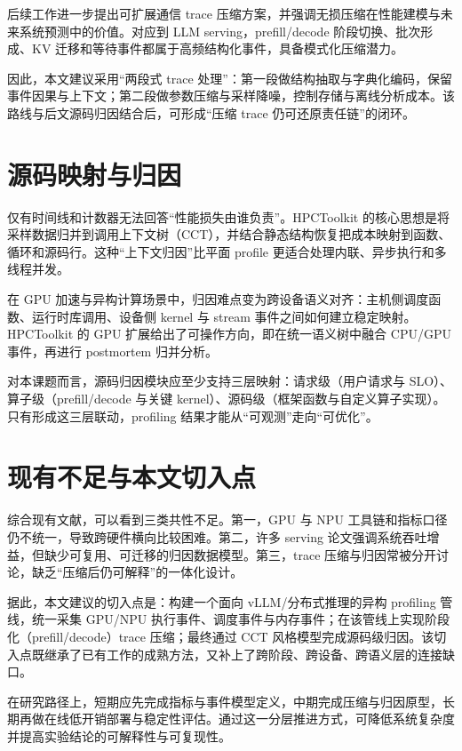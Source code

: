 \documentclass[supercite]{Experimental_Report}
\begin{document}
后续工作进一步提出可扩展通信 trace 压缩方案，并强调无损压缩在性能建模与未来系统预测中的价值\cite{krishnamoorthy2010scalabletrace}。对应到 LLM serving，prefill/decode 阶段切换、批次形成、KV 迁移和等待事件都属于高频结构化事件，具备模式化压缩潜力。

因此，本文建议采用“两段式 trace 处理”：第一段做结构抽取与字典化编码，保留事件因果与上下文；第二段做参数压缩与采样降噪，控制存储与离线分析成本。该路线与后文源码归因结合后，可形成“压缩 trace 仍可还原责任链”的闭环。

\section{源码映射与归因}

仅有时间线和计数器无法回答“性能损失由谁负责”。HPCToolkit 的核心思想是将采样数据归并到调用上下文树（CCT），并结合静态结构恢复把成本映射到函数、循环和源码行\cite{adhianto2010hpctoolkit}。这种“上下文归因”比平面 profile 更适合处理内联、异步执行和多线程并发。

在 GPU 加速与异构计算场景中，归因难点变为跨设备语义对齐：主机侧调度函数、运行时库调用、设备侧 kernel 与 stream 事件之间如何建立稳定映射。HPCToolkit 的 GPU 扩展给出了可操作方向，即在统一语义树中融合 CPU/GPU 事件，再进行 postmortem 归并分析\cite{zhou2021hpctoolkitgpu,adhianto2024refininghpctoolkit}。

对本课题而言，源码归因模块应至少支持三层映射：请求级（用户请求与 SLO）、算子级（prefill/decode 与关键 kernel）、源码级（框架函数与自定义算子实现）。只有形成这三层联动，profiling 结果才能从“可观测”走向“可优化”。

\section{现有不足与本文切入点}

综合现有文献，可以看到三类共性不足。第一，GPU 与 NPU 工具链和指标口径仍不统一，导致跨硬件横向比较困难。第二，许多 serving 论文强调系统吞吐增益，但缺少可复用、可迁移的归因数据模型。第三，trace 压缩与归因常被分开讨论，缺乏“压缩后仍可解释”的一体化设计\cite{kwon2023pagedattention,zhong2024distserve,noeth2009scalatrace,adhianto2010hpctoolkit}。

据此，本文建议的切入点是：构建一个面向 vLLM/分布式推理的异构 profiling 管线，统一采集 GPU/NPU 执行事件、调度事件与内存事件；在该管线上实现阶段化（prefill/decode）trace 压缩；最终通过 CCT 风格模型完成源码级归因。该切入点既继承了已有工作的成熟方法，又补上了跨阶段、跨设备、跨语义层的连接缺口。

在研究路径上，短期应先完成指标与事件模型定义，中期完成压缩与归因原型，长期再做在线低开销部署与稳定性评估。通过这一分层推进方式，可降低系统复杂度并提高实验结论的可解释性与可复现性。



\end{document}
